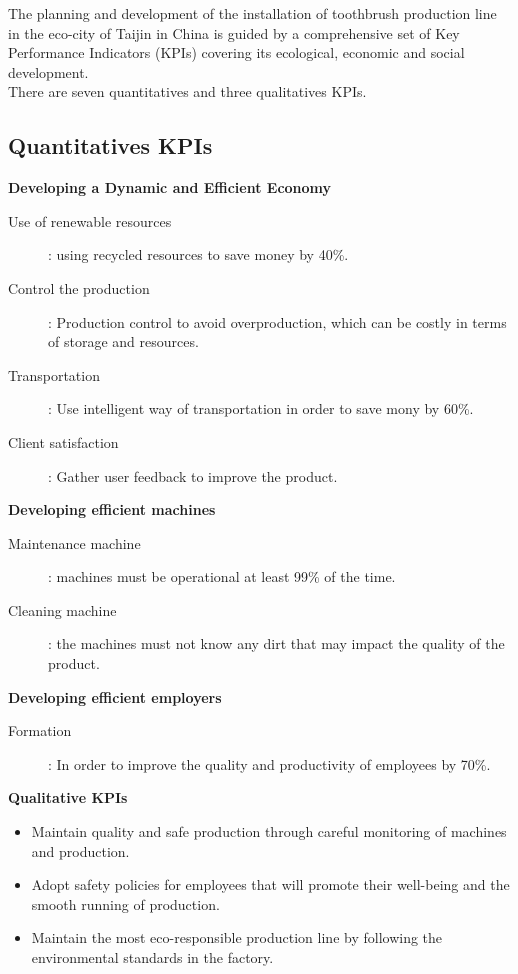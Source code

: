 The planning and development of the installation of toothbrush production line in the eco-city of Taijin in China is guided by a comprehensive set of Key Performance Indicators (KPIs) covering its ecological, economic and social development.\\

There are seven quantitatives and three qualitatives KPIs.

\subsection{Quantitatives KPIs}

\textbf{Developing a Dynamic and Efficient Economy}
\begin{description}
    \item[Use of renewable resources]: using recycled resources to save money by 40\%.
    \item[Control the production]: Production control to avoid overproduction, which can be costly in terms of storage and resources.
    \item[Transportation]: Use intelligent way of transportation in order to save mony by 60\%.
    \item[Client satisfaction]: Gather user feedback to improve the product.
\end{description}

\textbf{Developing efficient machines}
\begin{description}
    \item[Maintenance machine]: machines must be operational at least 99\% of the time.
    \item[Cleaning machine]: the machines must not know any dirt that may impact the quality of the product.
\end{description}

\textbf{Developing efficient employers}
\begin{description}
    \item[Formation]: In order to improve the quality and productivity of employees by 70\%.
\end{description}

\textbf{Qualitative KPIs}
\begin{itemize}
    \item Maintain quality and safe production through careful monitoring of machines and production.
    \item Adopt safety policies for employees that will promote their well-being and the smooth running of production.
    \item Maintain the most eco-responsible production line by following the environmental standards in the factory.
\end{itemize}

